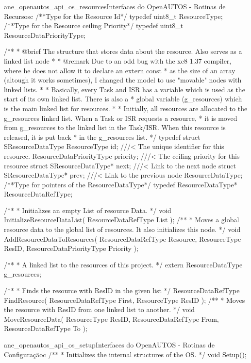 \begin{algoritmo}{ane_openautos_api_os_resources}{Interfaces do OpenAUTOS - Rotinas de Recursos}{c}
/**Type for the Resource Id*/
typedef uint8_t ResourceType;
/**Type for the Resource ceiling Priority*/
typedef uint8_t ResourceDataPriorityType;

/**
* @brief The structure that stores data about the resource. Also serves as a linked list node
* 
* @remark Due to an odd bug with the xc8 1.37 compiler, where he does not allow it to declare an extern const
* as the size of an array (altough it works sometimes), I changed the model to use "movable" nodes with linked lists.
* 
* Basically, every Task and ISR has a variable which is used as the start of its own linked list. There is also a
* global variable (g_resources) which is the main linked list for resources.
* 
* Initially, all resources are allocated to the g_resources linked list. When a Task or ISR requests a resource,
* it is moved from g_resources to the linked list in the Task/ISR. When this resource is released, it is put back
* in the g_resources list.
*/
typedef struct SResourceDataType {
	ResourceType id;                    ///< The unique identifier for this resource.
	ResourceDataPriorityType priority;  ///< The ceiling priority for this resource
	struct SResourceDataType* next;     ///< Link to the next node
	struct SResourceDataType* prev;     ///< Link to the previous node
} ResourceDataType;
/**Type for pointers of the ResourceDataType*/
typedef ResourceDataType* ResourceDataRefType;

/**
* Initializes an empty List of resource Data.
*/
void InitializeResourceDataList( ResourceDataRefType List );
/**
* Moves a global resource data to the global list of resources. It also initializes this node.
*/
void AddResourceDataToResources( ResourceDataRefType Resource, ResourceType ResID, ResourceDataPriorityType Priority );

/**
* A linked list to the resources of this project.
*/
extern ResourceDataType g_resources;

/**
* Finds the resource with ResID in the given list
*/
ResourceDataRefType FindResource( ResourceDataRefType First, ResourceType ResID );
/**
* Moves the resource with ResID from one linked list to another.
*/
void MoveResourceData( ResourceType ResID, ResourceDataRefType From, ResourceDataRefType To );
\end{algoritmo}

\begin{algoritmo}{ane_openautos_api_os_setup}{Interfaces do OpenAUTOS - Rotinas de Configuração}{c}
/**
* Initializes the internal structures of the OS.
*/
void Setup();
\end{algoritmo}

